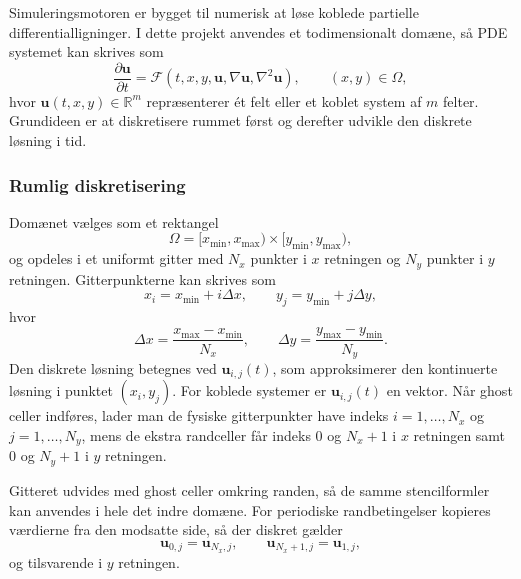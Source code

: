 Simuleringsmotoren er bygget til numerisk at løse koblede partielle differentialligninger. 
I dette projekt anvendes et todimensionalt domæne, så PDE systemet kan skrives som
\begin{equation}
    \frac{\partial \mathbf{u}}{\partial t}
    =
    \mathcal{F}\!\left(t,x,y,\mathbf{u},\nabla \mathbf{u},\nabla^2 \mathbf{u}\right),
    \qquad
    (x,y) \in \Omega ,
    \label{eq:general_pde_system}
\end{equation}
hvor $\mathbf{u}(t,x,y) \in \mathbb{R}^m$ repræsenterer ét felt eller et koblet system af $m$ felter. Grundideen er at diskretisere rummet først og derefter udvikle den diskrete løsning i tid.

\subsubsection{Rumlig diskretisering}
Domænet vælges som et rektangel
\[
    \Omega = [x_{\min},x_{\max}) \times [y_{\min},y_{\max}),
\]
og opdeles i et uniformt gitter med $N_x$ punkter i $x$ retningen og $N_y$ punkter i $y$ retningen. Gitterpunkterne kan skrives som
\[
    x_i = x_{\min} + i \Delta x,
    \qquad
    y_j = y_{\min} + j \Delta y,
\]
hvor
\[
    \Delta x = \frac{x_{\max}-x_{\min}}{N_x},
    \qquad
    \Delta y = \frac{y_{\max}-y_{\min}}{N_y}.
\]
Den diskrete løsning betegnes ved $\mathbf{u}_{i,j}(t)$, som approksimerer den kontinuerte løsning i punktet $(x_i,y_j)$. For koblede systemer er $\mathbf{u}_{i,j}(t)$ en vektor. Når ghost celler indføres, lader man de fysiske gitterpunkter have indeks $i=1,\dots,N_x$ og $j=1,\dots,N_y$, mens de ekstra randceller får indeks $0$ og $N_x+1$ i $x$ retningen samt $0$ og $N_y+1$ i $y$ retningen.

Gitteret udvides med ghost celler omkring randen, så de samme stencilformler kan anvendes i hele det indre domæne. For periodiske randbetingelser kopieres værdierne fra den modsatte side, så der diskret gælder
\[
    \mathbf{u}_{0,j} = \mathbf{u}_{N_x,j},
    \qquad
    \mathbf{u}_{N_x+1,j} = \mathbf{u}_{1,j},
\]
og tilsvarende i $y$ retningen.


